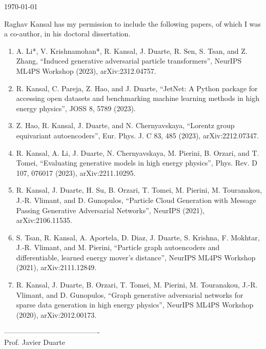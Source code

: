 \documentclass{article}
\begin{document}
\today

Raghav Kansal has my permission to include the following papers, of which
I was a co-author, in his doctoral dissertation.

\begin{enumerate}
    \item A. Li*, V. Krishnamohan*, R. Kansal, J. Duarte, R. Sen, S. Tsan, and Z. Zhang, “Induced generative adversarial particle transformers”, NeurIPS ML4PS Workshop (2023), arXiv:2312.04757.
    \item R. Kansal, C. Pareja, Z. Hao, and J. Duarte, “JetNet: A Python package for accessing open datasets and benchmarking machine learning methods in high energy physics”, JOSS 8, 5789 (2023).
    \item Z. Hao, R. Kansal, J. Duarte, and N. Chernyavskaya, “Lorentz group equivariant autoencoders”, Eur. Phys. J. C 83, 485 (2023), arXiv:2212.07347.
    \item R. Kansal, A. Li, J. Duarte, N. Chernyavskaya, M. Pierini, B. Orzari, and T. Tomei, “Evaluating generative models in high energy physics”, Phys. Rev. D 107, 076017 (2023), arXiv:2211.10295.
    \item R. Kansal, J. Duarte, H. Su, B. Orzari, T. Tomei, M. Pierini, M. Touranakou, J.-R. Vlimant, and D. Gunopulos, “Particle Cloud Generation with Message Passing Generative Adversarial Networks”, NeurIPS (2021), arXiv:2106.11535.
    \item S. Tsan, R. Kansal, A. Aportela, D. Diaz, J. Duarte, S. Krishna, F. Mokhtar, J.-R. Vlimant, and M. Pierini, “Particle graph autoencoders and differentiable, learned energy mover's distance”, NeurIPS ML4PS Workshop (2021), arXiv:2111.12849.
    \item R. Kansal, J. Duarte, B. Orzari, T. Tomei, M. Pierini, M. Touranakou, J.-R. Vlimant, and D. Gunopulos, “Graph generative adversarial networks for sparse data generation in high energy physics”, NeurIPS ML4PS Workshop (2020), arXiv:2012.00173.
\end{enumerate}

\baselineskip
----------------------------------------\\
Prof. Javier Duarte
\end{document}
